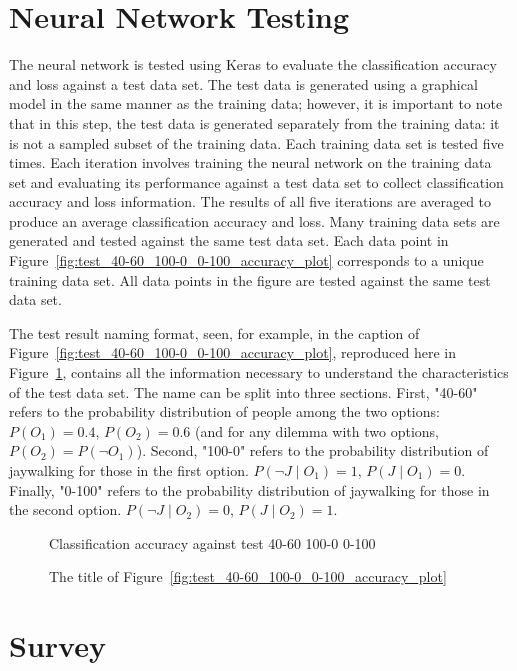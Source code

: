 \documentclass[paper=a4paper]{report}
\begin{document}
\FloatBarrier
\section{Neural Network Testing}

The neural network is tested using Keras to evaluate the classification accuracy and loss against a
test data set. The test data is generated using a graphical model in the same manner as the training
data; however, it is important to note that in this step, the test data is generated separately from
the training data: it is not a sampled subset of the training data. Each training data set is tested
five times. Each iteration involves training the neural network on the training data set and
evaluating its performance against a test data set to collect classification accuracy and loss
information. The results of all five iterations are averaged to produce an average classification
accuracy and loss. Many training data sets are generated and tested against the same test data set.
Each data point in Figure~\ref{fig:test_40-60_100-0_0-100_accuracy_plot} corresponds to a unique
training data set. All data points in the figure are tested against the same test data set.

The test result naming format, seen, for example, in the caption of
Figure~\ref{fig:test_40-60_100-0_0-100_accuracy_plot}, reproduced here in
Figure~\ref{fig:test_result_naming_example}, contains all the information necessary to understand
the characteristics of the test data set. The name can be split into three sections. First, "40-60"
refers to the probability distribution of people among the two options: $P(O_1) = 0.4$, $P(O_2) =
0.6$ (and for any dilemma with two options, $P(O_2) = P(\neg O_1)$). Second, "100-0" refers to the
probability distribution of jaywalking for those in the first option. $P(\neg J \mid O_1) = 1$, $P(J
\mid O_1) = 0$. Finally, "0-100" refers to the probability distribution of jaywalking for those in
the second option. $P(\neg J \mid O_2) = 0$, $P(J \mid O_2) = 1$.

\begin{figure}[h]
    \centering
    Classification accuracy against test 40-60 100-0 0-100
    \caption{The title of Figure~\ref{fig:test_40-60_100-0_0-100_accuracy_plot}}
    \label{fig:test_result_naming_example}
\end{figure}

\FloatBarrier
\section{Survey}
\end{document}

